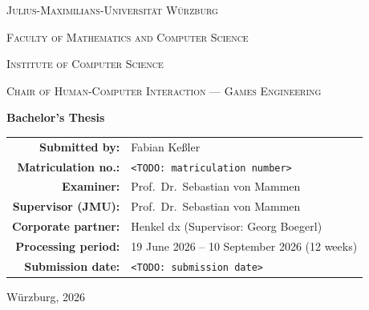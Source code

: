 \begin{titlepage}
\centering
\thispagestyle{empty}

{\scshape\large Julius-Maximilians-Universität Würzburg\par}
\vspace{0.3cm}
{\scshape Faculty of Mathematics and Computer Science\par}
{\scshape Institute of Computer Science\par}
{\scshape Chair of Human-Computer Interaction --- Games Engineering\par}

\vfill

{\Large\bfseries Bachelor's Thesis\par}
\vspace{0.8cm}
{\huge\bfseries \thesistitle\par}

\vfill

\begin{tabular}{rl}
\textbf{Submitted by:} & Fabian Keßler \\
\textbf{Matriculation no.:} & \texttt{<TODO: matriculation number>} \\[0.4em]
\textbf{Examiner:} & Prof.\ Dr.\ Sebastian von Mammen \\
\textbf{Supervisor (JMU):} & Prof.\ Dr.\ Sebastian von Mammen \\
\textbf{Corporate partner:} & Henkel dx (Supervisor: Georg Boegerl) \\[0.4em]
\textbf{Processing period:} & 19 June 2026 -- 10 September 2026 (12 weeks) \\
\textbf{Submission date:} & \texttt{<TODO: submission date>} \\
\end{tabular}

\vfill
{\small Würzburg, 2026\par}

\end{titlepage}
